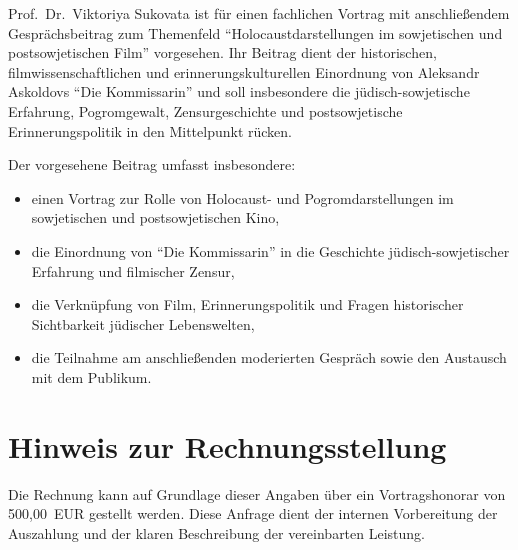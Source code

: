 \documentclass[11pt,a4paper]{article}
\begin{document}
Prof.\ Dr.\ Viktoriya Sukovata ist f\"ur einen fachlichen Vortrag mit anschlie{\ss}endem Gespr\"achsbeitrag zum Themenfeld \enquote{Holocaustdarstellungen im sowjetischen und postsowjetischen Film} vorgesehen. Ihr Beitrag dient der historischen, filmwissenschaftlichen und erinnerungskulturellen Einordnung von Aleksandr Askoldovs \enquote{Die Kommissarin} und soll insbesondere die j\"udisch-sowjetische Erfahrung, Pogromgewalt, Zensurgeschichte und postsowjetische Erinnerungspolitik in den Mittelpunkt r\"ucken.

Der vorgesehene Beitrag umfasst insbesondere:
\begin{itemize}
    \item einen Vortrag zur Rolle von Holocaust- und Pogromdarstellungen im sowjetischen und postsowjetischen Kino,
    \item die Einordnung von \enquote{Die Kommissarin} in die Geschichte j\"udisch-sowjetischer Erfahrung und filmischer Zensur,
    \item die Verkn\"upfung von Film, Erinnerungspolitik und Fragen historischer Sichtbarkeit j\"udischer Lebenswelten,
    \item die Teilnahme am anschlie{\ss}enden moderierten Gespr\"ach sowie den Austausch mit dem Publikum.
\end{itemize}

\section*{Hinweis zur Rechnungsstellung}

Die Rechnung kann auf Grundlage dieser Angaben \"uber ein Vortragshonorar von 500,00~EUR gestellt werden. Diese Anfrage dient der internen Vorbereitung der Auszahlung und der klaren Beschreibung der vereinbarten Leistung.
\end{document}
